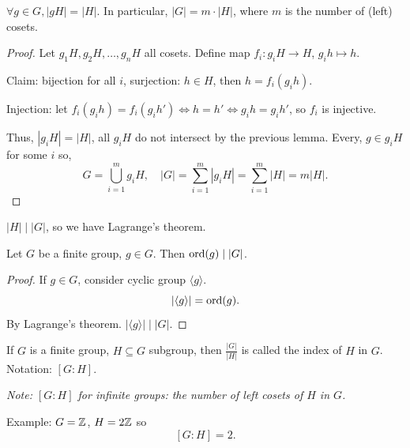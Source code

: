 \documentclass[10pt, a4paper]{article}
\begin{document}
\begin{lemma}\label{algII:lem:numleftcosetsmag}
    $\forall g \in G, |gH| = |H|$.
    In particular,
    $|G| = m \cdot |H|$,
    where $m$ is the number of
    (left)
    cosets.

    \begin{proof}
        Let $g_1H, g_2H, \dotsc, g_nH$ all cosets.
        Define map $f_i : g_iH \to H$,
        $g_ih \mapsto h$.

        Claim:
        bijection for all $i$,
        surjection:
        $h \in H$,
        then $h = f_i(g_ih)$.

        Injection:
        let $f_i(g_ih) = f_i(g_ih') \iff h = h' \iff g_ih = g_ih'$,
        so $f_i$ is injective.

        Thus,
        $|g_iH| = |H|$,
        all $g_iH$ do not intersect by the previous lemma.
        Every,
        $g \in g_iH$ for some $i$ so,
        \[
        G = \bigcup_{i = 1}^{m}g_iH,\quad |G| = \sum_{i = 1}^{m}|g_iH| = \sum_{i = 1}^{m}|H| = m|H|.
        \]
    \end{proof}
\end{lemma}

\begin{corollary}
    $|H| \mid |G|$,
    so we have Lagrange's theorem.
\end{corollary}

\begin{corollary}
    Let $G$ be a finite group,
    $g \in G$.
    Then $\operatorname{ord}(g) \mid |G|$.

    \begin{proof}
        If $g \in G$,
        consider cyclic group $\langle g \rangle $.
        \[
        |\langle g \rangle| = \operatorname{ord}(g).
        \]
        By Lagrange's theorem.
        $|\langle g \rangle| \mid |G|$.
    \end{proof}
\end{corollary}

\begin{definition}
    If $G$ is a finite group,
    $H \subseteq G$ subgroup,
    then $\frac{|G|}{|H|}$ is called the index of $H$ in $G$.
    Notation:
    $[G : H]$.
\end{definition}

\textit{Note:
$[G : H]$ for infinite groups:
the number of left cosets of $H$ in $G$.}

Example:
$G = \mathbb{Z}$,
$H = 2\mathbb{Z}$
so
\[
[G : H] = 2.
\]
\end{document}
